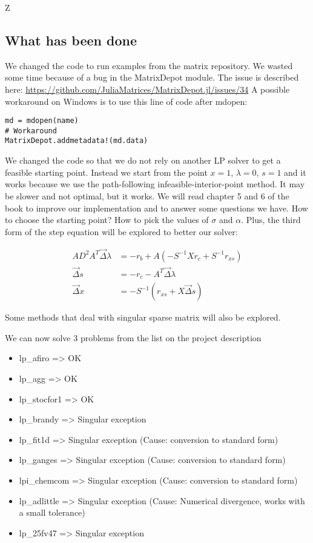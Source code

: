 Z\subsection{What has been done}\label{section:done}
We changed the code to run examples from the matrix repository. We wasted some time because of a bug in the MatrixDepot module. The issue is described here: \url{https://github.com/JuliaMatrices/MatrixDepot.jl/issues/34}
A possible workaround on Windows is to use this line of code after mdopen:
\begin{lstlisting}
md = mdopen(name)
# Workaround
MatrixDepot.addmetadata!(md.data)
\end{lstlisting}

We changed the code so that we do not rely on another LP solver to get a feasible starting point. Instead we start from the point $x=1$, $\lambda=0$, $s=1$ and it works because we use the path-following infeasible-interior-point method. It may be slower and not optimal, but it works. We will read chapter 5 and 6 of the book to improve our implementation and to answer some questions we have. How to choose the starting point? How to pick the values of $\sigma$ and $\alpha$. Plus, the third form of the step equation will be explored to better our solver:

\begin{align*}
A D^2 A^T \vec{\Delta} \lambda &= -r_b + A (-S^{-1} X r_c + S^{-1} r_{xs}) \\
\vec{\Delta} s &= - r_c - A^T \vec{\Delta} \lambda \\
\vec{\Delta} x &= -S^{-1} (r_{xs} + X \vec{\Delta}s)
\end{align*}

Some methods that deal with singular sparse matrix will also be explored.

We can now solve 3 problems from the list on the project description
\begin{itemize}
	\item lp\_afiro => OK 
	\item lp\_agg => OK 
	\item lp\_stocfor1 => OK
	\item lp\_brandy => Singular exception
	\item lp\_fit1d => Singular exception (Cause: conversion to standard form)
	\item lp\_ganges => Singular exception (Cause: conversion to standard form)
	\item lpi\_chemcom => Singular exception (Cause: conversion to standard form) 
	\item lp\_adlittle => Singular exception (Cause: Numerical divergence, works with a small tolerance) 
	\item lp\_25fv47 => Singular exception
\end{itemize}

